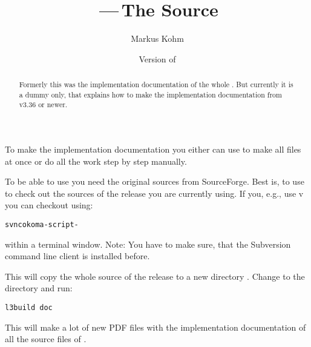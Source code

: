 \documentclass[USenglish]{koma-script-source-doc}
\title{\KOMAScript\,---\,The Source}
\date{Version \fileversion{} of \filedate}
\author{Markus Kohm}
\begin{document}
\maketitle
\begin{abstract}
  Formerly this was the implementation documentation of the whole
  \KOMAScript. But currently it is a dummy only, that explains how to make the
  implementation documentation from \KOMAScript{} v3.36 or newer.
\end{abstract}


To make the implementation documentation you either can use  to
make all files at once or do all the work step by step manually.

To be able to use  you need the original sources from
SourceForge. Best is, to use  to check out the sources of the
release you are currently using. If you, e.g., use \KOMAScript{} v\fileversion
you can checkout \releaseurl{} using:
\begin{alltt}\small
svn co \releaseurl koma-script-\fileversion
\end{alltt}
within a terminal window. Note: You have to make sure, that the Subversion
command line client  is installed before.

This will copy the whole source of the release to a new directory
. Change to the directory and run:
\begin{verbatim}
l3build doc
\end{verbatim}
This will make a lot of new PDF files with the implementation documentation of
all the source files of \KOMAScript.
\end{document}
